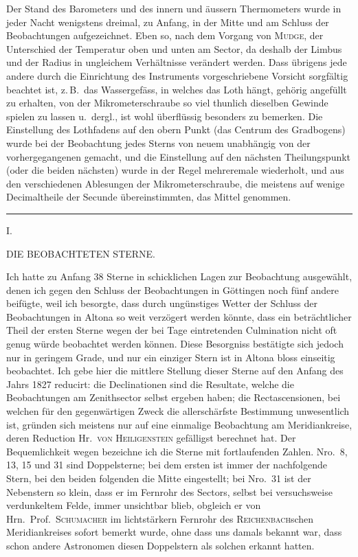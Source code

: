 Der Stand des Barometers und des innern und äussern Thermometers
wurde in jeder Nacht wenigstens dreimal, zu Anfang, in der Mitte und am
Schluss der Beobachtungen aufgezeichnet. Eben so, nach dem Vorgang von
\textsc{Mudge}, der Unterschied der Temperatur oben und unten am Sector, da deshalb
der Limbus und der Radius in ungleichem Verhältnisse verändert werden.
Dass übrigens jede andere durch die Einrichtung des Instruments vorgeschriebene
Vorsicht sorgfältig beachtet ist, z.\,B.\ das Wassergefäss, in welches das
Loth hängt, gehörig angefüllt zu erhalten, von der Mikrometerschraube so
viel thunlich dieselben Gewinde spielen zu lassen u.\ dergl., ist wohl überflüssig
besonders zu bemerken. Die Einstellung des Lothfadens auf den
obern Punkt (das Centrum des Gradbogens) wurde bei der Beobachtung jedes
Sterns von neuem unabhängig von der vorhergegangenen gemacht, und die
Einstellung auf den nächsten Theilungspunkt (oder die beiden nächsten) wurde
in der Regel mehreremale wiederholt, und aus den verschiedenen Ablesungen
der Mikrometerschraube, die meistens auf wenige Decimaltheile der Secunde
übereinstimmten, das Mittel genommen.

\begin{center}\rule{.24\textwidth}{.4pt}\end{center}

\clearpage
\vspace*{18mm}
\begin{center}
{\large I.}\par\medskip
{\Large DIE BEOBACHTETEN STERNE.}
\end{center}

Ich hatte zu Anfang 38 Sterne in schicklichen Lagen zur Beobachtung
ausgewählt, denen ich gegen den Schluss der Beobachtungen in Göttingen
noch fünf andere beifügte, weil ich besorgte, dass durch ungünstiges Wetter
der Schluss der Beobachtungen in Altona so weit verzögert werden könnte,
dass ein beträchtlicher Theil der ersten Sterne wegen der bei Tage eintretenden
Culmination nicht oft genug würde beobachtet werden können. Diese
Besorgniss bestätigte sich jedoch nur in geringem Grade, und nur ein einziger
Stern ist in Altona bloss einseitig beobachtet. Ich gebe hier die mittlere
Stellung dieser Sterne auf den Anfang des Jahrs 1827 reducirt: die Declinationen
sind die Resultate, welche die Beobachtungen am Zenithsector
selbst ergeben haben; die Rectascensionen, bei welchen für den gegenwärtigen
Zweck die allerschärfste Bestimmung unwesentlich ist, gründen sich meistens
nur auf eine einmalige Beobachtung am Meridiankreise, deren Reduction
Hr.\ \textsc{von Heiligenstein} gefälligst berechnet hat. Der Bequemlichkeit wegen
bezeichne ich die Sterne mit fortlaufenden Zahlen. Nro.\ 8, 13, 15 und 31
sind Doppelsterne; bei dem ersten ist immer der nachfolgende Stern, bei den
beiden folgenden die Mitte eingestellt; bei Nro.\ 31 ist der Nebenstern so
klein, dass er im Fernrohr des Sectors, selbst bei versuchsweise verdunkeltem
Felde, immer unsichtbar blieb, obgleich er von Hrn.\ Prof.\ \textsc{Schumacher} im
lichtstärkern Fernrohr des \textsc{Reichenbach}schen Meridiankreises sofort bemerkt
wurde, ohne dass uns damals bekannt war, dass schon andere Astronomen
diesen Doppelstern als solchen erkannt hatten.

